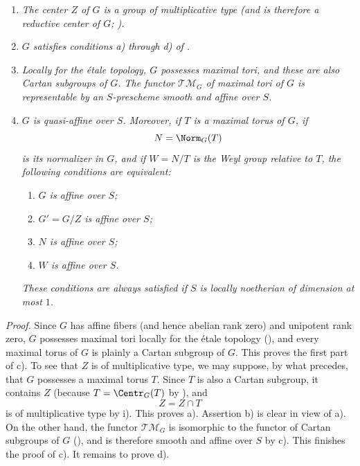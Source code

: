 \begin{enumerate}
\renewcommand{\labelenumi}{\textit{\alph{enumi})}}
\item \textit{The center \(Z\) of \(G\) is a group of
multiplicative type (and is therefore a reductive center of \(G\);
).}

\item \textit{\(G\) satisfies conditions a) through d) of .}

\item \textit{Locally for the étale topology, \(G\) possesses
maximal tori, and these are also Cartan subgroups of \(G\). The
functor \(\mathscr{TM}_G\) of maximal tori of \(G\) is
representable by an \(S\)-prescheme smooth and affine over \(S\).}

\item \textit{\(G\) is quasi-affine over \(S\). Moreover, if
\(T\) is a maximal torus of \(G\), if}
\[
  N=\Norm_G(T)
\]
\textit{is its normalizer in \(G\), and if \(W=N/T\) is the Weyl
group relative to \(T\), the following conditions are equivalent:}
\begin{enumerate}
\renewcommand{\labelenumii}{\textit{(\roman{enumii})}}
\item \textit{\(G\) is affine over \(S\);}
\item \textit{\(G'=G/Z\) is affine over \(S\);}
\item \textit{\(N\) is affine over \(S\);}
\item \textit{\(W\) is affine over \(S\).}
\end{enumerate}
\textit{These conditions are always satisfied if \(S\) is locally
noetherian of dimension at most \(1\).}
\end{enumerate}

\medskip
\noindent\textit{Proof.}
Since \(G\) has affine fibers (and hence abelian rank zero) and
unipotent rank zero, \(G\) possesses maximal tori locally for the
étale topology (), and every maximal torus of \(G\)
is plainly a Cartan subgroup of \(G\). This proves the first part
of c). To see that \(Z\) is of multiplicative type, we may suppose,
by what precedes, that \(G\) possesses a maximal torus \(T\).
Since \(T\) is also a Cartan subgroup, it contains \(Z\) (because
\(T=\Centr_G(T)\) by ), and
\[
  Z=Z\cap T
\]
is of multiplicative type by  i). This proves a). Assertion b)
is clear in view of a). On the other hand, the functor
\(\mathscr{TM}_G\) is isomorphic to the functor of Cartan
subgroups of \(G\) (), and is therefore smooth and
affine over \(S\) by  c). This finishes the proof of c). It
remains to prove d).

